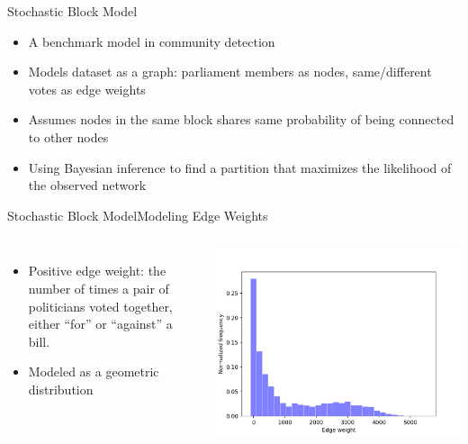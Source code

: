 \documentclass[xcolor=dvipsnames]{beamer}
\begin{document}
\begin{frame}{Stochastic Block Model}
  \begin{itemize}
    \item A benchmark model in community detection
    \item Models dataset as a graph: parliament members as nodes, same/different votes as edge weights
    \item Assumes nodes in the same block shares same probability of being connected to other nodes
    \item Using Bayesian inference to find a partition that maximizes the likelihood of the observed network
  \end{itemize}
\end{frame}

\begin{frame}{Stochastic Block Model}{Modeling Edge Weights}
  \scriptsize
  \begin{columns}
  \begin{itemize}
    \item Positive edge weight: the number of times a pair of politicians voted together, either ``for'' or ``against'' a bill.
    \item Modeled as a geometric distribution
  \end{itemize}
  \includegraphics[width=\linewidth]{sbm_edge_weight_hist}


\end{columns}
\end{frame}
\end{document}
